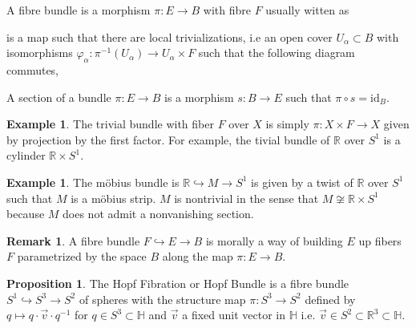 \documentclass[12pt]{extarticle}
\newcommand{\R}{\mathbb{R}}
\newcommand{\id}{\mathrm{id}}
\theoremstyle{definition}
\newtheorem{proposition}[theorem]{Proposition}
\newtheorem{example}[theorem]{Example}
\newtheorem{remark}{Remark}
\newenvironment{definition}[1][Definition:]{\begin{trivlist}
\item[\hskip \labelsep {\bfseries #1}]}{\end{trivlist}}
\renewcommand{\H}{\mathbb{H}}
\begin{document}
\begin{definition}
A fibre bundle is a morphism $\pi : E \to B$ with fibre $F$ usually witten as
\begin{center}
\end{center}
is a map such that there are local trivializations, i.e an open cover $U_\alpha \subset B$ with isomorphisms $\varphi_\alpha : \pi^{-1}(U_\alpha) \to U_\alpha \times F$ such that the following diagram commutes,
\begin{center}
\end{center}
\end{definition}

\begin{definition}
A section of a bundle $\pi : E \to B$ is a morphism $s : B \to E$ such that $\pi \circ s = \id_B$. 
\end{definition}

\begin{example}
The trivial bundle with fiber $F$ over $X$ is simply $\pi : X \times F \to X$ given by projection by the first factor. For example, the tivial bundle of $\R$ over $S^1$ is a cylinder $\R \times S^1$.  
\end{example}

\begin{example}
The m\"{o}bius bundle is $\R \hookrightarrow M \to S^1$ is given by a twist of $\R$ over $S^1$ such that $M$ is a m\"{o}bius strip. $M$ is nontrivial in the sense that $M \not\cong \R \times S^1$ because $M$ does not admit a nonvanishing section.
\end{example}

\begin{remark}
A fibre bundle $F \hookrightarrow E \to B$ is morally a way of building $E$ up fibers $F$ parametrized by the space $B$ along the map $\pi : E \to B$. 
\end{remark}

\begin{proposition}
The Hopf Fibration or Hopf Bundle is a fibre bundle $S^1 \hookrightarrow S^3 \to S^2$ of spheres with the structure map $\pi : S^3 \to S^2$ defined by $q \mapsto q \cdot \vec{v} \cdot q^{-1}$ for $q \in S^3 \subset \H$ and $\vec{v}$ a fixed unit vector in $\H$ i.e. $\vec{v} \in S^2 \subset \R^3 \subset \H$.  
\end{proposition}
\end{document}
